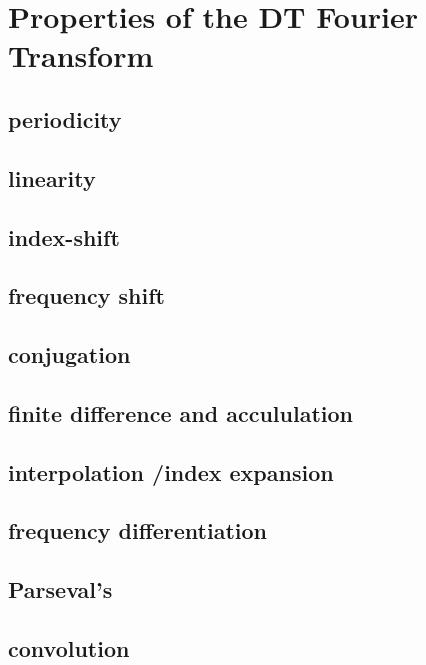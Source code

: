 \documentclass{article}
\begin{document}
\section{Properties of the DT Fourier Transform}
\label{sec:org4b60654}

\subsection{periodicity}
\label{sec:org561e56c}

\subsection{linearity}
\label{sec:org77a7f35}

\subsection{index-shift}
\label{sec:org31f43b8}

\subsection{frequency shift}
\label{sec:org52b250f}

\subsection{conjugation}
\label{sec:orgfd0a284}

\subsection{finite difference and accululation}
\label{sec:orgf78b609}

\subsection{interpolation /index expansion}
\label{sec:orge721dbd}

\subsection{frequency differentiation}
\label{sec:orgf122f6b}

\subsection{Parseval's}
\label{sec:orge091617}

\subsection{convolution}
\label{sec:orgd4030e8}
\end{document}
